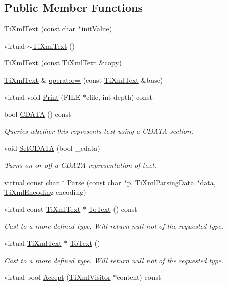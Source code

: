 \subsection*{Public Member Functions}
\begin{DoxyCompactItemize}
\item 
\hyperlink{class_ti_xml_text_af659e77c6b87d684827f35a8f4895960}{Ti\+Xml\+Text} (const char $\ast$init\+Value)
\item 
virtual \hyperlink{class_ti_xml_text_a829a4bd2d8d2461c333eb4f3f5b1b3d2}{$\sim$\+Ti\+Xml\+Text} ()
\item 
\hyperlink{class_ti_xml_text_a8d2cc1b4af2208cbb0171cf20f6815d1}{Ti\+Xml\+Text} (const \hyperlink{class_ti_xml_text}{Ti\+Xml\+Text} \&copy)
\item 
\hyperlink{class_ti_xml_text}{Ti\+Xml\+Text} \& \hyperlink{class_ti_xml_text_aed5b13f9c1b804c616fd533882c29f57}{operator=} (const \hyperlink{class_ti_xml_text}{Ti\+Xml\+Text} \&base)
\item 
virtual void \hyperlink{class_ti_xml_text_ae74d56c5b3ddec6cc3103dd51821af92}{Print} (F\+I\+LE $\ast$cfile, int depth) const 
\item 
bool \hyperlink{class_ti_xml_text_ad1a6a6b83fa2271022dd97c072a2b586}{C\+D\+A\+TA} () const 
\begin{DoxyCompactList}\small\item\em Queries whether this represents text using a C\+D\+A\+TA section. \end{DoxyCompactList}\item 
void \hyperlink{class_ti_xml_text_acb17ff7c5d09b2c839393445a3de5ea9}{Set\+C\+D\+A\+TA} (bool \+\_\+cdata)
\begin{DoxyCompactList}\small\item\em Turns on or off a C\+D\+A\+TA representation of text. \end{DoxyCompactList}\item 
virtual const char $\ast$ \hyperlink{class_ti_xml_text_abb3e10deb3391772b902247e8d75331f}{Parse} (const char $\ast$p, Ti\+Xml\+Parsing\+Data $\ast$data, \hyperlink{tinyxml_8h_a88d51847a13ee0f4b4d320d03d2c4d96}{Ti\+Xml\+Encoding} encoding)
\item 
virtual const \hyperlink{class_ti_xml_text}{Ti\+Xml\+Text} $\ast$ \hyperlink{class_ti_xml_text_a895bf34ffad17f7439ab2a52b9651648}{To\+Text} () const 
\begin{DoxyCompactList}\small\item\em Cast to a more defined type. Will return null not of the requested type. \end{DoxyCompactList}\item 
virtual \hyperlink{class_ti_xml_text}{Ti\+Xml\+Text} $\ast$ \hyperlink{class_ti_xml_text_ae7c3a8fd3e4dbf6c0c4363a943d72f5b}{To\+Text} ()
\begin{DoxyCompactList}\small\item\em Cast to a more defined type. Will return null not of the requested type. \end{DoxyCompactList}\item 
virtual bool \hyperlink{class_ti_xml_text_a43b9954ebf679557fac1a4453f337b7c}{Accept} (\hyperlink{class_ti_xml_visitor}{Ti\+Xml\+Visitor} $\ast$content) const 
\end{DoxyCompactItemize}
